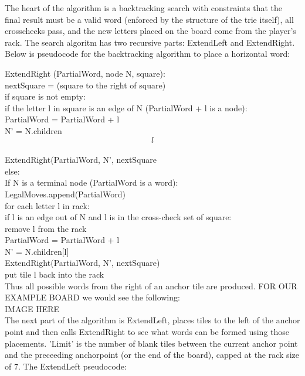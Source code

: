 \documentclass[12pt]{article}
\begin{document}
The heart of the algorithm is a backtracking search with constraints
that the final result must be a valid word (enforced by the structure
of the trie itself), all crosschecks pass, and the new letters placed
on the board come from the player's rack. The search algoritm has two
recursive parts: ExtendLeft and ExtendRight. Below is pseudocode for
the backtracking algorithm to place a horizontal word:

	ExtendRight (PartialWord, node N, square):\\
		nextSquare = (square to the right of square)\\
		if square is not empty:\\
			if the letter l in square is an edge of N (PartialWord + l is a node):\\
				PartialWord  = PartialWord + l\\
				N' = N.children\[l\]\\
				ExtendRight(PartialWord, N', nextSquare\\
		else:\\
			If N is a terminal node (PartialWord is a word):\\
				LegalMoves.append(PartialWord)\\
			for each letter l in rack:\\
				if l is an edge out of N and l is in the cross-check set of square:\\
					remove l from the rack\\
					PartialWord = PartialWord + l\\
					N' = N.children[l]\\
					ExtendRight(PartialWord, N', nextSquare)\\
					put tile l back into the rack\\

Thus all possible words from the right of an anchor tile are produced. FOR OUR EXAMPLE BOARD we would see the following: \\

IMAGE HERE\\

The next part of the algorithm is ExtendLeft, places tiles to the left
of the anchor point and then calls ExtendRight to see what words can
be formed using those placements. 'Limit' is the number of blank tiles
between the current anchor point and the preceeding anchorpoint (or the end of the board), capped at the rack size of 7. The ExtendLeft pseudocode: \\
\end{document}
